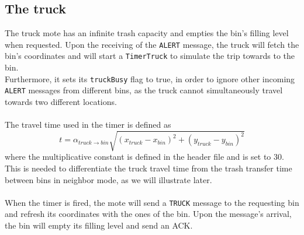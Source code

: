 \documentclass[a4paper,10pt]{article}
\begin{document}
\subsection{The truck}
The truck mote has an infinite trash capacity and empties the bin's filling level when requested. Upon the receiving of the \texttt{ALERT} message, the truck will fetch the bin's coordinates and will start a \texttt{TimerTruck} to simulate the trip towards to the bin. \\ Furthermore, it sets its \texttt{truckBusy} flag to true, in order to ignore other incoming \texttt{ALERT} messages from different bins, as the truck cannot simultaneously travel towards two different locations. \\ \\
The travel time used in the timer is defined as
\begin{equation} \label{xd}
	t=\alpha_{truck\rightarrow bin}\sqrt{\left(x_{truck} - x_{bin}\right)^2 + \left(y_{truck} - y_{bin}\right)^2}
\end{equation}
where the multiplicative constant is defined in the header file and is set to 30.  This is needed to differentiate the truck travel time from the trash transfer time between bins in neighbor mode, as we will illustrate later. \\\\
When the timer is fired, the mote will send a \texttt{TRUCK} message to the requesting bin and refresh its coordinates with the ones of the bin. Upon the message's arrival, the bin will empty its filling level and send an ACK.
\end{document}
